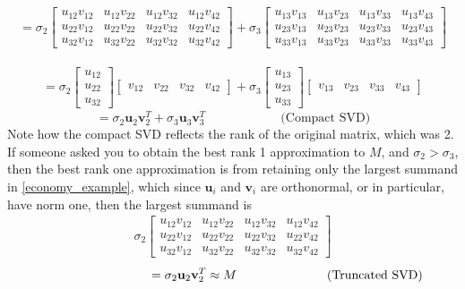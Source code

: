 \documentclass[11.5pt]{article}
\theoremstyle{definition}
\begin{document}
\begin{align*}
=\sigma_2 
\begin{bmatrix}
 u_{12}v_{12} & u_{12}v_{22} &  u_{12}v_{32} &  u_{12}v_{42} \\ 
u_{22}v_{12} &  u_{22}v_{22} &  u_{22}v_{32} &  u_{22}v_{42} \\ 
u_{32}v_{12} &  u_{32}v_{22} &  u_{32}v_{32} &  u_{32}v_{42}
\end{bmatrix} + \sigma_3
\begin{bmatrix}
 u_{13}v_{13} & u_{13}v_{23} &  u_{13}v_{33} &  u_{13}v_{43} \\ 
u_{23}v_{13}  &  u_{23}v_{23} &  u_{23}v_{33} &  u_{23}v_{43} \\ 
u_{33}v_{13}  &  u_{33}v_{23} &  u_{33}v_{33} &  u_{33}v_{43}
\end{bmatrix}
\end{align*}

\begin{align*}
=\sigma_2 \begin{bmatrix}
u_{12} \\ 
u_{22} \\ 
u_{32}
\end{bmatrix} 
\begin{bmatrix}
v_{12} & v_{22} & v_{32} & v_{42}
\end{bmatrix} +
\sigma_3 \begin{bmatrix}
u_{13} \\ 
u_{23} \\ 
u_{33}
\end{bmatrix} 
\begin{bmatrix}
v_{13} & v_{23} & v_{33} & v_{43}
\end{bmatrix} 
\end{align*}
\begin{equation}\label{economy_example}
=\sigma_2 \mathbf{u}_{2}\mathbf{v}_{2}^T+\sigma_3 \mathbf{u}_{3}\mathbf{v}_{3}^T\hspace{1in}\text{(Compact SVD)}
\end{equation}
Note how the compact SVD reflects the rank of the original matrix, which was 2. If someone asked you to obtain the best rank 1 approximation to $M$, and $\sigma_2>\sigma_3$, then the best rank one approximation is from retaining only the largest summand in \eqref{economy_example}, which since $\mathbf{u}_i$ and  $\mathbf{v}_i$ are orthonormal, or in particular, have norm one, then the largest summand is
\begin{align*}
\sigma_2 
\begin{bmatrix}
 u_{12}v_{12} & u_{12}v_{22} &  u_{12}v_{32} &  u_{12}v_{42} \\ 
u_{22}v_{12} &  u_{22}v_{22} &  u_{22}v_{32} &  u_{22}v_{42} \\ 
u_{32}v_{12} &  u_{32}v_{22} &  u_{32}v_{32} &  u_{32}v_{42}
\end{bmatrix} 
\end{align*}
\begin{equation}\label{truncated_example}
\hspace{1.2in}=\sigma_2 \mathbf{u}_{2}\mathbf{v}_{2}^T\approx M \hspace{1in}\text{(Truncated SVD)}
\end{equation}
\end{document}
